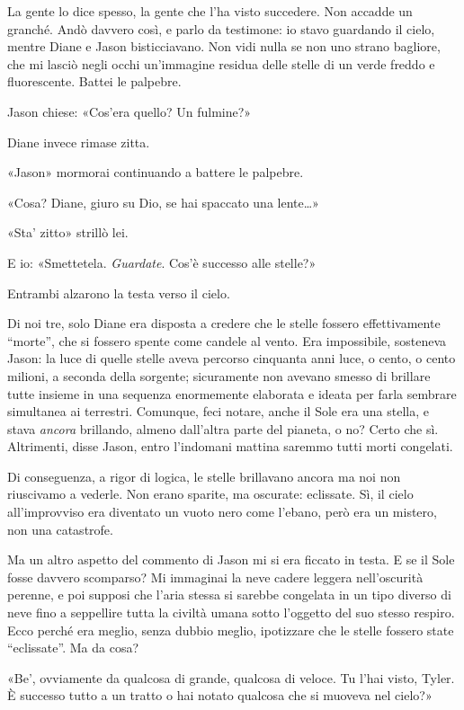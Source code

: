 La gente lo dice spesso, la gente che l'ha visto succedere. Non accadde
un granché. Andò davvero così, e parlo da testimone: io stavo guardando
il cielo, mentre Diane e Jason bisticciavano. Non vidi nulla se non uno
strano bagliore, che mi lasciò negli occhi un'immagine residua delle
stelle di un verde freddo e fluorescente. Battei le palpebre.

Jason chiese: «Cos'era quello? Un fulmine?»

Diane invece rimase zitta.

«Jason» mormorai continuando a battere le palpebre.

«Cosa? Diane, giuro su Dio, se hai spaccato una lente\ldots»

«Sta' zitto» strillò lei.

E io: «Smettetela. \emph{Guardate}. Cos'è successo alle stelle?»

Entrambi alzarono la testa verso il cielo.

\separatorefiori

Di noi tre, solo Diane era disposta a credere che le stelle fossero
effettivamente ``morte'', che si fossero spente come candele al vento.
Era impossibile, sosteneva Jason: la luce di quelle stelle aveva
percorso cinquanta anni luce, o cento, o cento milioni, a seconda della
sorgente; sicuramente non avevano smesso di brillare tutte insieme in
una sequenza enormemente elaborata e ideata per farla sembrare
simultanea ai terrestri. Comunque, feci notare, anche il Sole era una
stella, e stava \emph{ancora} brillando, almeno dall'altra parte del
pianeta, o no? Certo che sì. Altrimenti, disse Jason, entro l'indomani
mattina saremmo tutti morti congelati.

Di conseguenza, a rigor di logica, le stelle brillavano ancora ma noi
non riuscivamo a vederle. Non erano sparite, ma oscurate: eclissate. Sì,
il cielo all'improvviso era diventato un vuoto nero come l'ebano, però
era un mistero, non una catastrofe.

Ma un altro aspetto del commento di Jason mi si era ficcato in testa. E
se il Sole fosse davvero scomparso? Mi immaginai la neve cadere leggera
nell'oscurità perenne, e poi supposi che l'aria stessa si sarebbe
congelata in un tipo diverso di neve fino a seppellire tutta la civiltà
umana sotto l'oggetto del suo stesso respiro. Ecco perché era meglio,
senza dubbio meglio, ipotizzare che le stelle fossero state
``eclissate''. Ma da cosa?

«Be', ovviamente da qualcosa di grande, qualcosa di veloce. Tu l'hai
visto, Tyler. È successo tutto a un tratto o hai notato qualcosa che si
muoveva nel cielo?»

